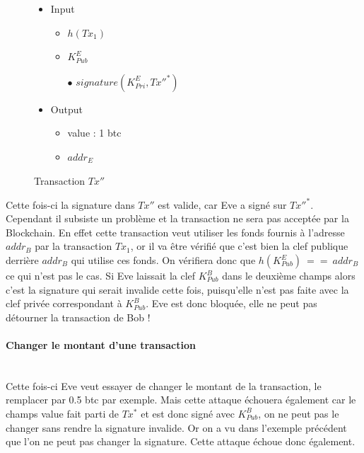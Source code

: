 \documentclass[11pt,a4paper]{article}
\begin{document}
\begin{figure}[H]
\begin{itemize}
\renewcommand{\labelitemi}{$\bullet$}
\renewcommand{\labelitemii}{$\star$}

\item Input
\begin{itemize}
\item $h(Tx_1)$
\item $K_{Pub}^{E}$
\item[$\bullet$] $signature(K_{Pri}^{E}, Tx''^*)$
\end{itemize}

\item Output
\begin{itemize}
\item value : 1 btc
\item $addr_E$
\end{itemize}

\end{itemize}

\caption{Transaction $Tx''$}
\end{figure}

Cette fois-ci la signature dans $Tx''$ est valide, car Eve a signé sur 
$Tx''^*$. Cependant il subsiste un problème et la transaction ne sera pas acceptée par la Blockchain. En effet cette transaction veut utiliser les fonds fournis à l'adresse $addr_B$ par la transaction $Tx_1$, or il va être vérifié que c'est bien la clef publique derrière $addr_B$ qui utilise ces fonds. On vérifiera donc que $h(K_{Pub}^{E}) ~==~ addr_B$ ce qui n'est pas le cas. Si Eve laissait la clef $K_{Pub}^{B}$ dans le deuxième champs alors c'est la signature qui serait invalide cette fois, puisqu'elle n'est pas faite avec la clef privée correspondant à $K_{Pub}^{B}$. Eve est donc bloquée, elle ne peut pas détourner la transaction de Bob !

\paragraph{Changer le montant d'une transaction\\\\}

Cette fois-ci Eve veut essayer de changer le montant de la transaction, le remplacer par 0.5 btc par exemple. Mais cette attaque échouera également car le champs value fait parti de $Tx^*$ et est donc signé avec $K_{Pub}^B$, on ne peut pas le changer sans rendre la signature invalide. Or on a vu dans l'exemple précédent que l'on ne peut pas changer la signature. Cette attaque échoue donc également.
\end{document}
